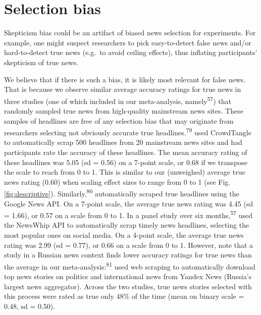 \documentclass[
  man]{apa6}
\begin{document}
\clearpage

\section{Selection bias}\label{selection-bias}

Skepticism bias could be an artifact of biased news selection for experiments. For example, one might suspect researchers to pick easy-to-detect false news and/or hard-to-detect true news (e.g.~to avoid ceiling effects), thus inflating participants' skepticism of true news.

We believe that if there is such a bias, it is likely most relevant for false news. That is because we observe similar average accuracy ratings for true news in three studies (one of which included in our meta-analysis, namely\textsuperscript{57}) that randomly sampled true news from high-quality mainstream news sites. These samples of headlines are free of any selection bias that may originate from researchers selecting not obviously accurate true headlines.\textsuperscript{79} used CrowdTangle to automatically scrap 500 headlines from 20 mainstream news sites and had participants rate the accuracy of these headlines. The mean accuracy rating of these headlines was 5.05 (sd = 0.56) on a 7-point scale, or 0.68 if we transpose the scale to reach from 0 to 1. This is similar to our (unweighed) average true news rating (0.60) when scaling effect sizes to range from 0 to 1 (see Fig. \ref{fig:descriptive}). Similarly,\textsuperscript{80} automatically scraped true headlines using the Google News API. On a 7-point scale, the average true news rating was 4.45 (sd = 1.66), or 0.57 on a scale from 0 to 1. In a panel study over six months,\textsuperscript{57} used the NewsWhip API to automatically scrap timely news headlines, selecting the most popular ones on social media. On a 4-point scale, the average true news rating was 2.99 (sd = 0.77), or 0.66 on a scale from 0 to 1. However, note that a study in a Russian news context finds lower accuracy ratings for true news than the average in our meta-analysis:\textsuperscript{81} used web scraping to automatically download top news stories on politics and international news from Yandex News (Russia's largest news aggregator). Across the two studies, true news stories selected with this process were rated as true only 48\% of the time (mean on binary scale = 0.48, sd = 0.50).
\end{document}
